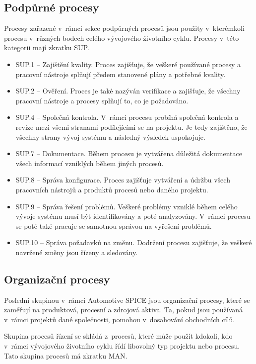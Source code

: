 \documentclass[czech,master]{diploma}
\begin{document}
\subsection{Podpůrné procesy}
Procesy zařazené v~rámci sekce podpůrných procesů jsou použity v~kterémkoli procesu v~různých bodech celého vývojového životního cyklu. Procesy v~této kategorii mají zkratku SUP.

\begin{itemize}
\item SUP.1 -- Zajištění kvality. Proces zajišťuje, že veškeré používané procesy a pracovní nástroje splňují předem stanovené plány a potřebné kvality.
\item SUP.2 -- Ověření. Proces je také nazýván verifikace a zajišťuje, že všechny pracovní nástroje a procesy splňují to, co je požadováno.
\item SUP.4 -- Společná kontrola. V~rámci procesu probíhá společná kontrola a revize mezi všemi stranami podílejícími se na projektu. Je tedy zajištěno, že všechny strany vývoj systému a následný výsledek uspokojuje.
\item SUP.7 -- Dokumentace. Během procesu je vytvářena důležitá dokumentace všech informací vzniklých během jiných procesů.
\item SUP.8 -- Správa konfigurace. Proces zajišťuje vytváření a údržbu všech pracovních nástrojů a produktů procesů nebo daného projektu.
\item SUP.9 -- Správa řešení problémů. Veškeré problémy vzniklé během celého vývoje systému musí být identifikovány a poté analyzovány. V~rámci procesu se poté také pracuje se samotnou správou na vyřešení problémů.
\item SUP.10 -- Správa požadavků na změnu. Dodržení procesu zajišťuje, že veškeré navržené změny jsou řízeny a sledovány.
\end{itemize}

\subsection{Organizační procesy}
Poslední skupinou v~rámci Automotive SPICE jsou organizační procesy, které se zaměřují na produktová, procesní a zdrojová aktiva. Ta, pokud jsou používaná v~rámci projektů dané společnosti, pomohou v~dosahování obchodních cílů.

Skupina procesů řízení se skládá z~procesů, které může použít kdokoli, kdo v~rámci vývojového životního cyklu řídí libovolný typ projektu nebo procesu. Tato skupina procesů má zkratku MAN.
\end{document}
